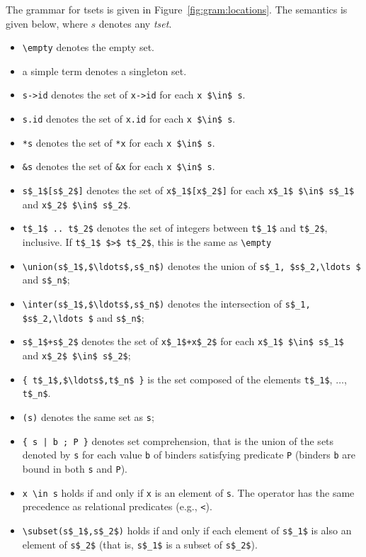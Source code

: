 The grammar for tsets is given in
Figure~\ref{fig:gram:locations}. The semantics is given below,
where $s$ denotes any \textsl{tset}.
\begin{itemize}
\item \lstinline|\empty| denotes the empty set.
\item a simple term denotes a singleton set.
\item \lstinline|s->id| denotes the set of \lstinline|x->id| for each
  \lstinline|x $\in$ s|.
\item \lstinline|s.id| denotes the set of \lstinline|x.id| for each
  \lstinline|x $\in$ s|.
\item \lstinline|*s| denotes the set of \lstinline|*x| for each
  \lstinline|x $\in$ s|.
\item \lstinline|&s| denotes the set of \lstinline|&x| for each
  \lstinline|x $\in$ s|.
\item \lstinline|s$_1$[s$_2$]| denotes the set of
\lstinline|x$_1$[x$_2$]| for each \lstinline|x$_1$ $\in$ s$_1$|
  and \lstinline|x$_2$ $\in$ s$_2$|.
\item \lstinline|t$_1$ .. t$_2$| denotes the set of integers between 
\lstinline|t$_1$| and \lstinline|t$_2$|, inclusive. 
If \lstinline|t$_1$ $>$ t$_2$|, this is the same as \lstinline+\empty+
\item \lstinline|\union(s$_1$,$\ldots$,s$_n$)|
denotes the union 
of \lstinline|s$_1, $s$_2,\ldots $| and \lstinline|s$_n$|;
\item \lstinline|\inter(s$_1$,$\ldots$,s$_n$)|
denotes the intersection 
of \lstinline|s$_1, $s$_2,\ldots $| and \lstinline|s$_n$|;
\item \lstinline|s$_1$+s$_2$| denotes the set of
  \lstinline|x$_1$+x$_2$| for each \lstinline|x$_1$ $\in$ s$_1$|
  and \lstinline|x$_2$ $\in$ s$_2$|;
\item \lstinline|{ t$_1$,$\ldots$,t$_n$ }| is the set composed of the
elements \lstinline|t$_1$|, $\ldots$, \lstinline|t$_n$|.
\item \lstinline|(s)| denotes the same set as \lstinline|s|;
\item \lstinline+{ s | b ; P }+ denotes set
  comprehension,
  that is the union of the sets denoted by \lstinline|s| for each
  value \lstinline|b| of binders
  satisfying predicate \lstinline|P|
  (binders \lstinline|b| are bound in both \lstinline|s| and \lstinline|P|).
\item \lstinline|x \in s| holds if and only if \lstinline|x| is an element of \lstinline|s|.
  The operator has the same precedence as relational predicates (e.g., \lstinline|<|).
\item \lstinline|\subset(s$_1$,s$_2$)| holds if and only if each element
  of \lstinline|s$_1$| is also an element of \lstinline|s$_2$|
  (that is, \lstinline|s$_1$| is a subset of \lstinline|s$_2$|).
\end{itemize}

